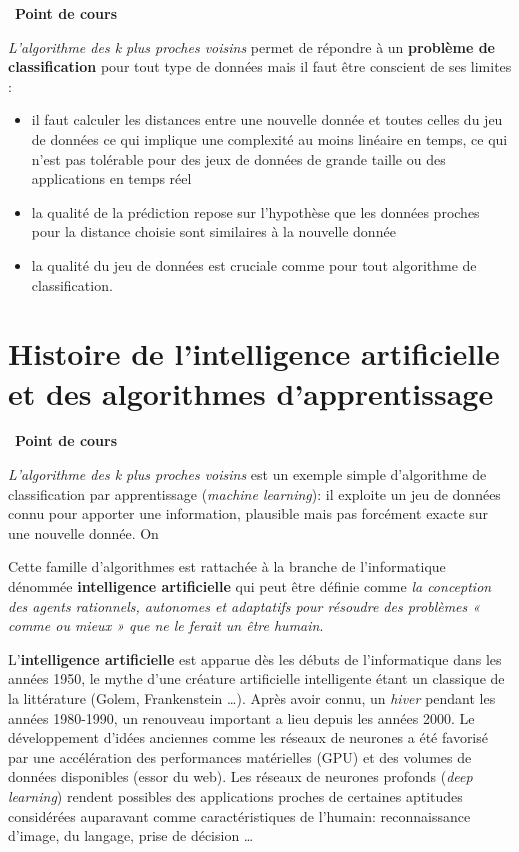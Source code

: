 \documentclass[
  11pt,
]{article}
\providecommand{\tightlist}{%
  \setlength{\itemsep}{0pt}\setlength{\parskip}{0pt}}
\newcounter{thme}
\newcounter{cours}
\newenvironment{cours}[1]
{\par \medskip   \addtocounter{cours}{1} \noindent  
\begin{bclogo}[arrondi =0.1,  ombre = true, barre=none, logo=\bcbook, marge=4]{~\textbf{Point de cours} \textbf{\thecours} {\itshape #1} }  \par}
{
\end{bclogo}
 \par \bigskip }
\newcounter{alg}
\newcounter{histo}
\begin{document}
\begin{cours}{}

\emph{L'algorithme des k plus proches voisins} permet de répondre à un
\textbf{problème de classification} pour tout type de données mais il
faut être conscient de ses limites :

\begin{itemize}
\tightlist
\item
  il faut calculer les distances entre une nouvelle donnée et toutes
  celles du jeu de données ce qui implique une complexité au moins
  linéaire en temps, ce qui n'est pas tolérable pour des jeux de données
  de grande taille ou des applications en temps réel
\item
  la qualité de la prédiction repose sur l'hypothèse que les données
  proches pour la distance choisie sont similaires à la nouvelle donnée
\item
  la qualité du jeu de données est cruciale comme pour tout algorithme
  de classification.
\end{itemize}

\end{cours}

\hypertarget{histoire-de-lintelligence-artificielle-et-des-algorithmes-dapprentissage}{%
\section{Histoire de l'intelligence artificielle et des algorithmes
d'apprentissage}\label{histoire-de-lintelligence-artificielle-et-des-algorithmes-dapprentissage}}

\begin{cours}{}

\emph{L'algorithme des k plus proches voisins} est un exemple simple
d'algorithme de classification par apprentissage (\emph{machine
learning}): il exploite un jeu de données connu pour apporter une
information, plausible mais pas forcément exacte sur une nouvelle
donnée. On

Cette famille d'algorithmes est rattachée à la branche de l'informatique
dénommée \textbf{intelligence artificielle} qui peut être définie comme
\emph{la conception des agents rationnels, autonomes et adaptatifs pour
résoudre des problèmes « comme ou mieux » que ne le ferait un être
humain}.

L'\textbf{intelligence artificielle} est apparue dès les débuts de
l'informatique dans les années 1950, le mythe d'une créature
artificielle intelligente étant un classique de la littérature (Golem,
Frankenstein \ldots{}). Après avoir connu, un \emph{hiver} pendant les
années 1980-1990, un renouveau important a lieu depuis les années 2000.
Le développement d'idées anciennes comme les réseaux de neurones a été
favorisé par une accélération des performances matérielles (GPU) et des
volumes de données disponibles (essor du web). Les réseaux de neurones
profonds (\emph{deep learning}) rendent possibles des applications
proches de certaines aptitudes considérées auparavant comme
caractéristiques de l'humain: reconnaissance d'image, du langage, prise
de décision \ldots{}

\end{cours}
\end{document}
